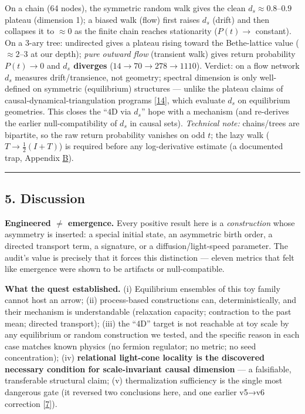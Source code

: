 On a chain (64 nodes), the symmetric random walk gives the clean
\(d_s\approx0.8\)--\(0.9\) plateau (dimension 1); a biased walk (flow)
first raises \(d_s\) (drift) and then collapses it to \(\approx0\) as
the finite chain reaches stationarity (\(P(t)\to\) constant). On a 3-ary
tree: undirected gives a plateau rising toward the Bethe-lattice value
(\(\approx2\)--\(3\) at our depth); \emph{pure outward flow} (transient
walk) gives return probability \(P(t)\to0\) and \textbf{\(d_s\)
diverges} (\(14\to70\to278\to1110\)). Verdict: on a flow network \(d_s\)
measures drift/transience, not geometry; spectral dimension is only
well-defined on symmetric (equilibrium) structures --- unlike the
plateau claims of causal-dynamical-triangulation programs
{[}\hyperref[ref-14]{14}{]}, which evaluate \(d_s\) on equilibrium
geometries. This closes the ``\(4\)D via \(d_s\)'' hope with a mechanism
(and re-derives the earlier null-compatibility of \(d_s\) in causal
sets). \emph{Technical note:} chains/trees are bipartite, so the raw
return probability vanishes on odd \(t\); the lazy walk
(\(T\to\frac12(I+T)\)) is required before any log-derivative estimate (a
documented trap, Appendix \hyperref[appendix-b-trap-catalog]{B}).

\begin{center}\rule{0.5\linewidth}{0.5pt}\end{center}

\subsection{5. Discussion}\label{discussion}

\textbf{Engineered \(\ne\) emergence.} Every positive result here is a
\emph{construction} whose asymmetry is inserted: a special initial
state, an asymmetric birth order, a directed transport term, a
signature, or a diffusion/light-speed parameter. The audit's value is
precisely that it forces this distinction --- eleven metrics that felt
like emergence were shown to be artifacts or null-compatible.

\textbf{What the quest established.} (i) Equilibrium ensembles of this
toy family cannot host an arrow; (ii) process-based constructions can,
deterministically, and their mechanism is understandable (relaxation
capacity; contraction to the past mean; directed transport); (iii) the
``4D'' target is not reachable at toy scale by any equilibrium or random
construction we tested, and the specific reason in each case matches
known physics (no fermion regulator; no metric; no seed concentration);
(iv) \textbf{relational light-cone locality is the discovered necessary
condition for scale-invariant causal dimension} --- a falsifiable,
transferable structural claim; (v) thermalization sufficiency is the
single most dangerous gate (it reversed two conclusions here, and one
earlier v5→v6 correction {[}\hyperref[ref-7]{7}{]}).

